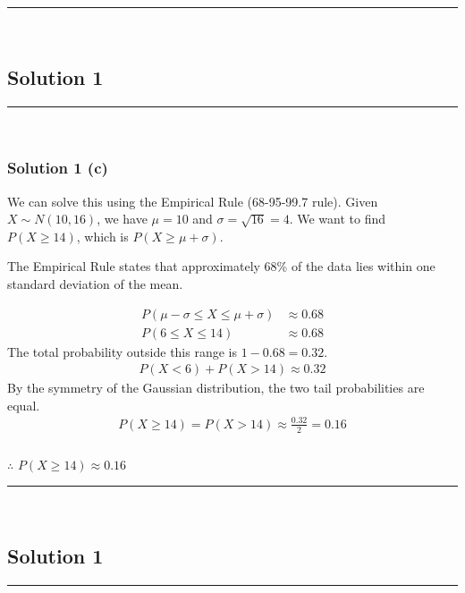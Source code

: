 \documentclass{article}
\begin{document}
\noindent\rule{\textwidth}{0.4pt}\\

\newpage

\subsection*{Solution 1}
\noindent\rule{\textwidth}{0.4pt}\\
\subsubsection*{Solution 1 (c)}
We can solve this using the Empirical Rule (68-95-99.7 rule).
Given $X \sim N(10, 16)$, we have $\mu = 10$ and $\sigma = \sqrt{16} = 4$.
We want to find $P(X \geq 14)$, which is $P(X \geq \mu + \sigma)$.


\begin{flushleft}
    The Empirical Rule states that approximately 68\% of the data lies within one standard deviation of the mean.
\end{flushleft}
\begin{align*}
    P(\mu - \sigma \leq X \leq \mu + \sigma) &\approx 0.68 \\
    P(6 \leq X \leq 14) &\approx 0.68
\end{align*}
The total probability outside this range is $1 - 0.68 = 0.32$.
\begin{align*}
    P(X < 6) + P(X > 14) \approx 0.32
\end{align*}
By the symmetry of the Gaussian distribution, the two tail probabilities are equal.
\begin{align*}
    P(X \geq 14) = P(X > 14) \approx \frac{0.32}{2} = 0.16
\end{align*}

\subsubsection*{\normalfont}{$\therefore$ $P(X \geq 14) \approx 0.16$}

\noindent\rule{\textwidth}{0.4pt}\\

\newpage

\subsection*{Solution 1}
\noindent\rule{\textwidth}{0.4pt}\\
\end{document}
